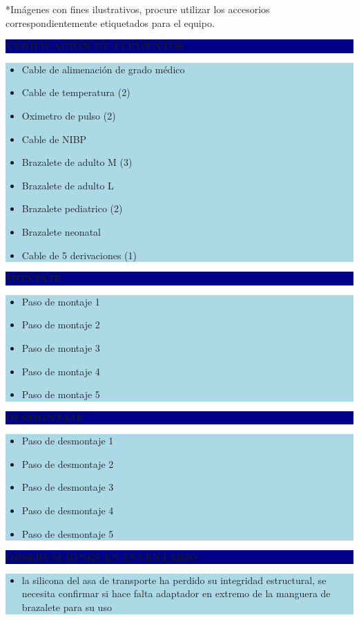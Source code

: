 \documentclass[11pt]{article}
\newcommand{\seccionbanda}[1]{%
  \vspace{0.6em}
  \noindent\colorbox{darkblue}{\parbox{\dimexpr\linewidth-2\fboxsep}{%
    \centering\color{white}\bfseries #1}}\par\vspace{0.6em}
}
\begin{document}
\vspace{0.5em}
\footnotesize{*Imágenes con fines ilustrativos, procure utilizar los accesorios correspondientemente etiquetados para el equipo.}
\normalsize

\newpage
\seccionbanda{VERIFICACIÓN DE ELEMENTOS}
\noindent\colorbox{lightblue}{\parbox{\dimexpr\linewidth-2\fboxsep\relax}{%
\begin{itemize}[label=$\square$, itemsep=4pt]
\item Cable de alimenación de grado médico
\item Cable de temperatura (2)
\item Oximetro de pulso (2)
\item Cable de NIBP
\item Brazalete de adulto M (3)
\item Brazalete de adulto L
\item Brazalete pediatrico (2)
\item Brazalete neonatal
\item Cable de 5 derivaciones (1)
\end{itemize}
}}\par

\seccionbanda{MONTAJE}
\noindent\colorbox{lightblue}{\parbox{\dimexpr\linewidth-2\fboxsep\relax}{%
\begin{itemize}[label=$\square$, itemsep=4pt]
\item Paso de montaje 1
\item Paso de montaje 2
\item Paso de montaje 3
\item Paso de montaje 4
\item Paso de montaje 5
\end{itemize}
}}\par

\seccionbanda{DESMONTAJE}
\noindent\colorbox{lightblue}{\parbox{\dimexpr\linewidth-2\fboxsep\relax}{%
\begin{itemize}[label=$\square$, itemsep=4pt]
\item Paso de desmontaje 1
\item Paso de desmontaje 2
\item Paso de desmontaje 3
\item Paso de desmontaje 4
\item Paso de desmontaje 5
\end{itemize}
}}\par
\seccionbanda{OBSERVACIONES EN INVENTARIO}
\noindent\colorbox{lightblue}{\parbox{\dimexpr\linewidth-2\fboxsep\relax}{\begin{itemize}[itemsep=4pt]
\item la silicona del asa de transporte ha perdido su integridad estructural, se necesita confirmar si hace falta adaptador en extremo de la manguera de brazalete para su uso
\end{itemize}}}\par
\end{document}
